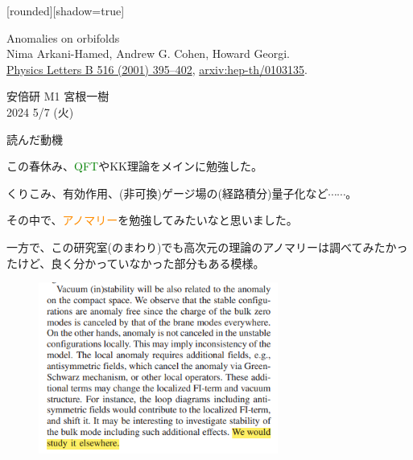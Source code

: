 \documentclass[
  unicode,a4paper,10pt,
  xcolor = {dvipsnames,svgnames},
  hyperref ={colorlinks=true,citecolor=Navy,linkcolor=NavyBlue,urlcolor=purple},
  ja=standard,lualatex
]{beamer}
\begin{document}
\nocite{Arkani-Hamed:2001uol}

\begin{frame}

  [rounded][shadow=true]
  \begin{block}{}
    \vspace*{5pt}

    \centering\Large
    Anomalies on orbifolds
    \\
    \normalsize
    Nima Arkani-Hamed, Andrew G. Cohen, Howard Georgi.
    \\
    \small
    \href{https://doi.org/10.1016/S0370-2693(01)00946-7}{Physics Letters B 516 (2001) 395–402},
    \href{https://doi.org/10.48550/arXiv.hep-th/0103135}{arxiv:hep-th/0103135}.

    \vspace*{5pt}
  \end{block}

  \begin{center}
    安倍研 M1 宮根一樹\\
    2024 5/7 (火)
  \end{center}
\end{frame}


\begin{frame}{読んだ動機}

  この春休み、\textcolor{Green}{QFT}やKK理論をメインに勉強した。

  \vspace*{5pt}
  
  くりこみ、有効作用、(非可換)ゲージ場の(経路積分)量子化など$\cdots\cdots$。

  \vspace*{5pt}
  
  その中で、\textcolor{DarkOrange}{アノマリー}を勉強してみたいなと思いました。

\end{frame}


\begin{frame}

  一方で、この研究室(のまわり)でも高次元の理論のアノマリーは調べてみたかったけど、良く分かっていなかった部分もある模様。
  \begin{figure}[ht]
    \includegraphics[width=0.7\textwidth]{fig/Abe2020vmv.png}
    \cite{Abe:2020vmv}
  \end{figure}

\end{frame}
\end{document}
